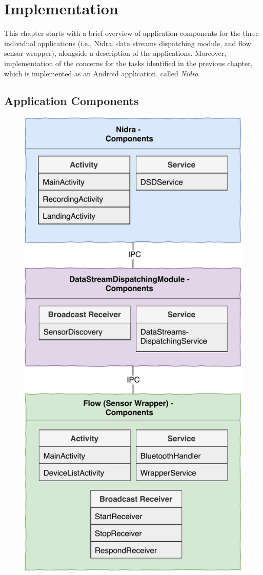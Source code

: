 \chapter{Implementation}
This chapter starts with a brief overview of application components for the three individual applications (i.e., Nidra, data streams dispatching module, and flow sensor wrapper), alongside a description of the applications. Moreover, implementation of the concerns for the tasks identified in the previous chapter, which is implemented as an Android application, called \textit{Nidra}. 
\section{Application Components} \label{impl:appcomp}

\begin{figure}
    \centering
    \includegraphics[scale=0.95]{images/Android_Components.pdf}

\end{figure}
